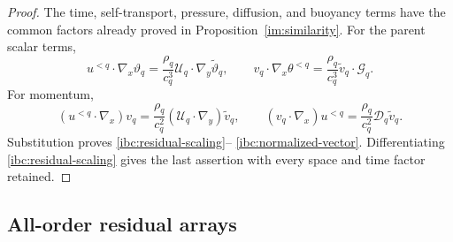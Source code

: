 \begin{proof}
The time, self-transport, pressure, diffusion, and buoyancy terms have the
common factors already proved in Proposition~\ref{im:similarity}.  For the
parent scalar terms,
\[
 u^{<q}\cdot\nabla_x\vartheta_q
 =\frac{\rho_q}{c_q^3}\mathcal U_q\cdot
       \nabla_y\widetilde\vartheta_q,\qquad
 v_q\cdot\nabla_x\theta^{<q}
 =\frac{\rho_q}{c_q^3}\widetilde v_q\cdot\mathcal G_q.
\]
For momentum,
\[
 (u^{<q}\cdot\nabla_x)v_q
 =\frac{\rho_q}{c_q^2}(\mathcal U_q\cdot\nabla_y)
       \widetilde v_q,\qquad
 (v_q\cdot\nabla_x)u^{<q}
 =\frac{\rho_q}{c_q^2}\mathcal D_q\widetilde v_q.
\]
Substitution proves \eqref{ibc:residual-scaling}--
\eqref{ibc:normalized-vector}.  Differentiating
\eqref{ibc:residual-scaling} gives the last assertion with every space and
time factor retained.
\end{proof}

\subsection{All-order residual arrays}

